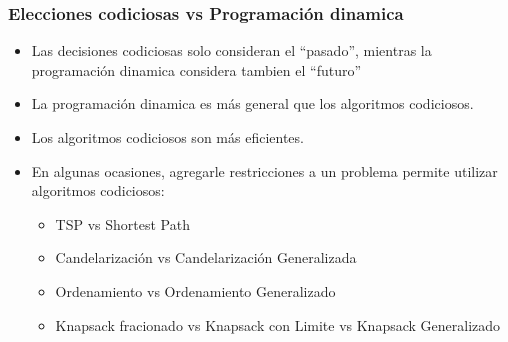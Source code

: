 \documentclass{beamer}
\begin{document}
\begin{frame}
\frametitle{Elecciones codiciosas vs Programaci\'on dinamica}
\begin{itemize}
    \item{Las decisiones codiciosas solo consideran el ``pasado'',
    mientras la programaci\'on dinamica considera tambien el ``futuro''}
    \item{La programaci\'on dinamica es m\'as general que los
    algoritmos codiciosos.}
    \item{Los algoritmos codiciosos son m\'as eficientes.}
    \item{En algunas ocasiones, agregarle restricciones a un problema
    permite utilizar algoritmos codiciosos:
        \begin{itemize}
            \item{TSP vs Shortest Path}
            \item{Candelarizaci\'on vs Candelarizaci\'on Generalizada}
            \item{Ordenamiento vs Ordenamiento Generalizado}
            \item{Knapsack fracionado vs Knapsack con Limite vs Knapsack Generalizado}
        \end{itemize}}
\end{itemize}
\end{frame}
\end{document}
